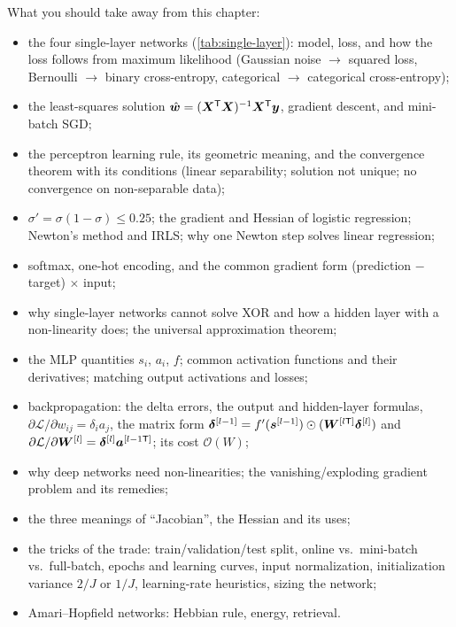 \documentclass[11pt, oneside]{book}
\newcommand{\T}{^{\mathsf{T}}}           %
\newcommand{\inv}{^{-1}}                 %
\newcommand{\loss}{\mathcal{L}}          %
\newcommand{\params}{\boldsymbol{\theta}}   %
\newcommand{\bigO}[1]{\mathcal{O}\!\left(#1\right)}
\newcommand{\ba}{\bm{a}}        \newcommand{\bs}{\bm{s}}
\newcommand{\bX}{\bm{X}}        \newcommand{\bY}{\bm{Y}}
\newcommand{\bdelta}{\bm{\delta}}
\newcommand{\what}{\hat{\bm{w}}}
\newcommand{\lay}[1]{^{[#1]}}            %
\begin{document}
What you should take away from this chapter:
\begin{itemize}
  \item the four single-layer networks (\cref{tab:single-layer}): model,
    loss, and how the loss follows from maximum likelihood (Gaussian noise
    $\to$ squared loss, Bernoulli $\to$ binary cross-entropy, categorical
    $\to$ categorical cross-entropy);
  \item the least-squares solution $\what = (\bX\T\bX)\inv\bX\T\by$, gradient
    descent, and mini-batch SGD;
  \item the perceptron learning rule, its geometric meaning, and the
    convergence theorem with its conditions (linear separability; solution
    not unique; no convergence on non-separable data);
  \item $\sigma' = \sigma(1-\sigma) \le 0.25$; the gradient and Hessian of
    logistic regression; Newton's method and IRLS; why one Newton step
    solves linear regression;
  \item softmax, one-hot encoding, and the common gradient form
    (prediction $-$ target) $\times$ input;
  \item why single-layer networks cannot solve XOR and how a hidden layer
    with a non-linearity does; the universal approximation theorem;
  \item the MLP quantities $s_i$, $a_i$, $f$; common activation functions
    and their derivatives; matching output activations and losses;
  \item backpropagation: the delta errors, the output and hidden-layer
    formulas, $\partial\loss/\partial w_{ij} = \delta_i a_j$, the matrix
    form $\bdelta\lay{l-1} = f'(\bs\lay{l-1}) \odot (\bW\lay{l\mathsf{T}}
    \bdelta\lay{l})$ and $\partial\loss/\partial\bW\lay{l} =
    \bdelta\lay{l}\ba\lay{l-1\mathsf{T}}$; its cost $\bigO{W}$;
  \item why deep networks need non-linearities; the vanishing/exploding
    gradient problem and its remedies;
  \item the three meanings of ``Jacobian'', the Hessian and its uses;
  \item the tricks of the trade: train/validation/test split, online vs.\
    mini-batch vs.\ full-batch, epochs and learning curves, input
    normalization, initialization variance $2/J$ or $1/J$, learning-rate
    heuristics, sizing the network;
  \item Amari--Hopfield networks: Hebbian rule, energy, retrieval.
\end{itemize}
\end{document}
